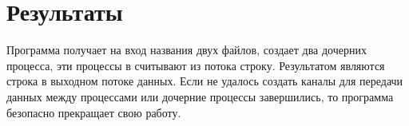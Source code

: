 \section{Результаты}

Программа получает на вход названия двух файлов, создает два дочерних процесса, эти
процессы в считывают из потока строку.
Результатом являются строка в выходном потоке данных. Если не удалось создать каналы
для передачи данных между процессами или дочерние процессы завершились, то программа
безопасно прекращает свою работу.